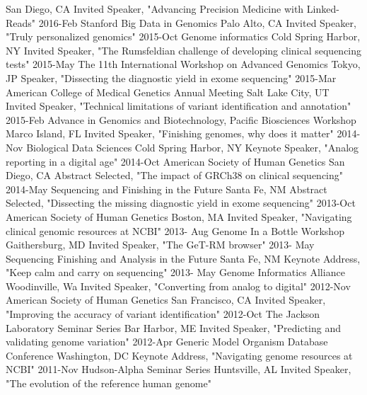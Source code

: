 \documentclass[]{dmc-cv} %
\begin{document}
\begin{entrylist}
{San Diego, CA}
{Invited Speaker, "Advancing Precision Medicine with Linked-Reads"}
\entry
{2016-Feb}
{Stanford Big Data in Genomics}
{Palo Alto, CA}
{Invited Speaker, "Truly personalized genomics"}
\entry
{2015-Oct}
{Genome informatics}
{Cold Spring Harbor, NY}
{Invited Speaker, "The Rumsfeldian challenge of developing clinical sequencing tests"}
\entry
{2015-May}
{The 11th International Workshop on Advanced Genomics}
{Tokyo, JP}
{Speaker, "Dissecting the diagnostic yield in exome sequencing"}
\entry
{2015-Mar}
{American College of Medical Genetics Annual Meeting}
{Salt Lake City, UT}
{Invited Speaker, "Technical limitations of variant identification and annotation"}
\entry
{2015-Feb}
{Advance in Genomics and Biotechnology, Pacific Biosciences Workshop}
{Marco Island, FL}
{Invited Speaker, "Finishing genomes, why does it matter"}
\entry
{2014-Nov}
{Biological Data Sciences}
{Cold Spring Harbor, NY}
{Keynote Speaker, "Analog reporting in a digital age"}
\entry
{2014-Oct}
{American Society of Human Genetics}
{San Diego, CA}
{Abstract Selected, "The impact of GRCh38 on clinical sequencing"}
\entry
{2014-May}
{Sequencing and Finishing in the Future}
{Santa Fe, NM}
{Abstract Selected, "Dissecting the missing diagnostic yield in exome sequencing"}
\entry
{2013-Oct}
{American Society of Human Genetics}
{Boston, MA}
{Invited Speaker, "Navigating clinical genomic resources at NCBI"}
\entry
{2013- Aug}
{Genome In a Bottle Workshop}
{Gaithersburg, MD}
{Invited Speaker, "The GeT-RM browser"}
\entry
{2013- May}
{Sequencing Finishing and Analysis in the Future}
{Santa Fe, NM}
{Keynote Address, "Keep calm and carry on sequencing"}
\entry
{2013- May}
{Genome Informatics Alliance}
{Woodinville, Wa}
{Invited Speaker, "Converting from analog to digital"}
\entry
{2012-Nov}
{American Society of Human Genetics}
{San Francisco, CA}
{Invited Speaker, "Improving the accuracy of variant identification"}
\entry
{2012-Oct}
{The Jackson Laboratory Seminar Series}
{Bar Harbor, ME}
{Invited Speaker, "Predicting and validating genome variation"}
\entry
{2012-Apr}
{Generic Model Organism Database Conference}
{Washington, DC}
{Keynote Address, "Navigating genome resources at NCBI"}
\entry
{2011-Nov}
{Hudson-Alpha Seminar Series}
{Huntsville, AL}
{Invited Speaker, "The evolution of the reference human genome"}

\end{entrylist}
\end{document}
